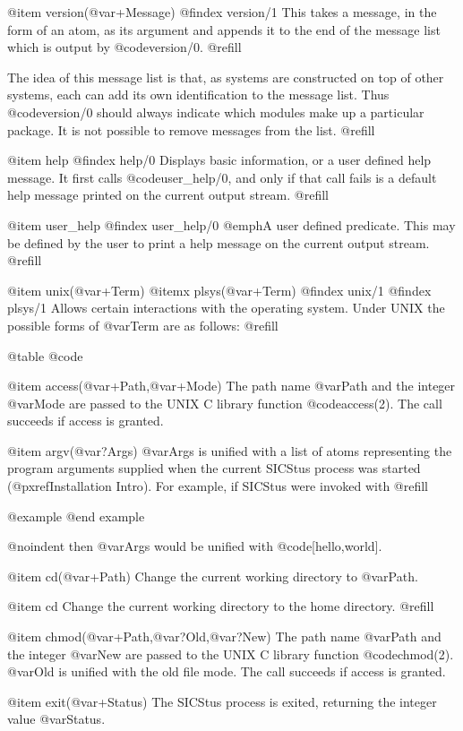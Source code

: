 @item version(@var{+Message})
@findex version/1
This takes a message, in the form of an atom, as its argument and appends
it to the end of the message list which is output by @code{version/0}. @refill

The idea of this message list is that, as systems are constructed on top of
other systems, each can add its own identification to the message list.
Thus @code{version/0} should always indicate which modules make up a particular
package.  It is not possible to remove messages from the list. @refill

@item help
@findex help/0
Displays basic information, or a user defined help message.
It first calls @code{user_help/0}, and only if that call fails
is a default help message printed on the current output stream. @refill

@item user_help
@findex user_help/0
@emph{A user defined predicate.} This may be defined by the user to
print a help message on the current output stream. @refill

@item unix(@var{+Term})
@itemx plsys(@var{+Term})
@findex unix/1
@findex plsys/1
Allows certain interactions with the operating system.  Under UNIX the
possible forms of @var{Term} are as follows: @refill

@table @code

@item access(@var{+Path},@var{+Mode})
The path name @var{Path} and the integer @var{Mode} are passed to
the UNIX C library function @code{access(2)}.  The call succeeds if access
is granted.

@item argv(@var{?Args})
@var{Args} is unified with a list of atoms representing the program
arguments supplied when the current SICStus process was started
(@pxref{Installation Intro}).  For example, if SICStus were invoked with
@refill

@example
@end example

@noindent
then @var{Args} would be unified with @code{[hello,world]}.

@item cd(@var{+Path})
Change the current working directory to @var{Path}.

@item cd
Change the current working directory to the home directory. @refill

@item chmod(@var{+Path},@var{?Old},@var{?New})
The path name @var{Path} and the integer @var{New} are passed to the
UNIX C library function @code{chmod(2)}.  @var{Old} is unified with the
old file mode.  The call succeeds if access is granted.

@item exit(@var{+Status})
The SICStus process is exited, returning the integer value @var{Status}.

